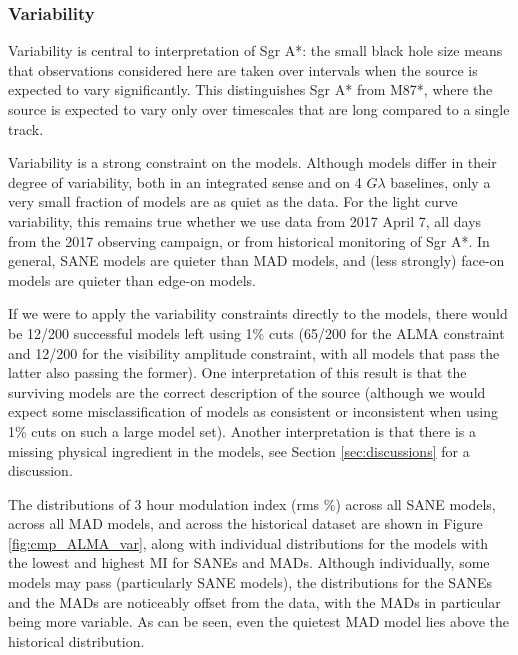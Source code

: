 \subsubsection{Variability}

Variability is central to interpretation of Sgr A*: the small black hole size means that observations considered here are taken over intervals when the source is expected to vary significantly.  This distinguishes Sgr A* from M87*, where the source is expected to vary only over timescales that are long compared to a single track.

Variability is a strong constraint on the models.  Although models differ in their degree of variability, both in an integrated sense and on 4 $G\lambda$ baselines, only a very small fraction of models are as quiet as the data.  For the light curve variability, this remains true whether we use data from 2017 April 7, all days from the 2017 observing campaign, or from historical monitoring of Sgr A*.   In general, SANE models are quieter than MAD models, and (less strongly) face-on models are quieter than edge-on models.

If we were to apply the variability constraints directly to the models, there would be 12/200 successful models left using 1\% cuts (65/200 for the ALMA constraint and 12/200 for the visibility amplitude constraint, with all models that pass the latter also passing the former).  One interpretation of this result is that the surviving models are the correct description of the source (although we would expect some misclassification of models as consistent or inconsistent when using 1\% cuts on such a large model set).  Another interpretation is that there is a missing physical ingredient in the models, see Section \ref{sec:discussions} for a discussion.


The distributions of 3 hour modulation index (rms \%) across all SANE models, across all MAD models, and across the historical dataset are shown in Figure \ref{fig:cmp_ALMA_var}, along with individual distributions for the models with the lowest and highest MI for SANEs and MADs. Although individually, some models may pass (particularly SANE models), the distributions for the SANEs and the MADs are noticeably offset from the data, with the MADs in particular being more variable. As can be seen, even the quietest MAD model lies above the historical distribution. 

